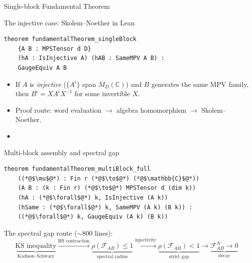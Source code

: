\documentclass[aspectratio=169,10pt]{beamer}
\newcommand{\cF}{\mathcal{F}}
\begin{document}
\begin{frame}[fragile]{Single-block Fundamental Theorem}
    \vspace{-0.4em}
    \begin{block}{The injective case: Skolem--Noether in Lean}
    \end{block}
    \vspace{-0.4em}
\begin{lstlisting}
theorem fundamentalTheorem_singleBlock
    {A B : MPSTensor d D}
    (hA : IsInjective A) (hAB : SameMPV A B) :
    GaugeEquiv A B
\end{lstlisting}
    \vspace{0.3em}
    \begin{itemize}
        \item If $A$ is \emph{injective} ($\{A^i\}$ span $M_D(\mathbb{C})$) and $B$ generates the same MPV family, then $B^i = X A^i X^{-1}$ for some invertible $X$.
        \item Proof route: word evaluation $\to$ algebra homomorphism $\to$ Skolem--Noether.
        \item {}
    \end{itemize}
\end{frame}

\begin{frame}[fragile]{Multi-block assembly and spectral gap}
    \vspace{-0.4em}
\begin{lstlisting}
theorem fundamentalTheorem_multiBlock_full
    ((*@$\mu$@*) : Fin r (*@$\to$@*) (*@$\mathbb{C}$@*))
    (A B : (k : Fin r) (*@$\to$@*) MPSTensor d (dim k))
    (hA : (*@$\forall$@*) k, IsInjective (A k))
    (hSame : (*@$\forall$@*) k, SameMPV (A k) (B k)) :
    ((*@$\forall$@*) k, GaugeEquiv (A k) (B k))
\end{lstlisting}
    \vspace{0.3em}
    The spectral gap route ($\sim$800 lines):
    \[
    \underbrace{\text{KS inequality}}_{\text{Kadison--Schwarz}}
    \xrightarrow{ \text{HS contraction} }
    \underbrace{\rho(\cF_{AB}) \le 1}_{\text{spectral radius}}
    \xrightarrow{ \text{injectivity} }
    \underbrace{\rho(\cF_{AB}) < 1}_{\text{strict gap}}
    \xrightarrow{   }
    \underbrace{\cF_{AB}^N \to 0}_{\text{decay}}
    \]
\end{frame}
\end{document}
